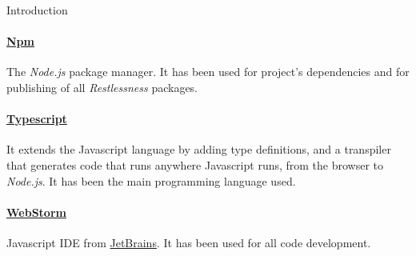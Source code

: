 \begin{chapter}{Introduction}
    \paragraph{\href{https://www.npmjs.com/}{Npm}}
    The \textit{Node.js} package manager. It has been used for project's dependencies
    and for publishing of all \textit{Restlessness} packages.


    \paragraph{\href{https://www.typescriptlang.org/}{Typescript}}
    It extends the Javascript language by adding type definitions, and a transpiler that generates
    code that runs anywhere Javascript runs, from the browser to \textit{Node.js}. It has been the
    main programming language used.

    \paragraph{\href{https://www.jetbrains.com/webstorm}{WebStorm}}
    Javascript IDE from \href{https://www.jetbrains.com}{JetBrains}. It has been used for
    all code development.

\end{chapter}
